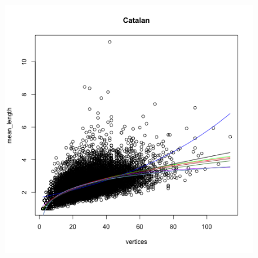 \documentclass[paper=a4, fontsize=11pt]{scrartcl} %
\begin{document}
\begin{figure}
\begin{minipage}{.5\textwidth}
  \label{fig:10}
\end{minipage}
\end{figure}


\begin{figure}
\centering
\begin{minipage}{\textwidth}
\centering
\begin{minipage}{.5\textwidth}
  \centering
  \includegraphics[width=\linewidth]{Mean_Catalan1}
  \label{fig:cat1}
\end{minipage}%
\begin{minipage}{.5\textwidth}
  \centering

\end{minipage}
\end{minipage}
\end{figure}
\end{document}
